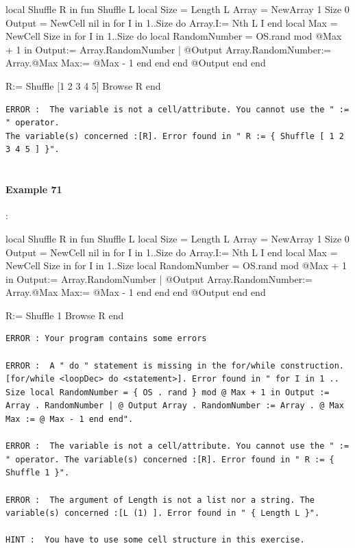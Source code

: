 \documentclass[11pt,a4paper,twoside,openright]{report}
\begin{document}
\begin{OZ}
local Shuffle R in 
    fun {Shuffle L}
		local
            Size = {Length L}
            Array = {NewArray 1 Size 0}
            Output = {NewCell nil}
        in
            for I in 1..Size do
    			Array.I:= {Nth L I}
    		end
            local
                Max = {NewCell Size}
            in
                for I in 1..Size do
                    local RandomNumber = {OS.rand} mod @Max + 1 in
                    Output:= Array.RandomNumber | @Output
                    Array.RandomNumber:= Array.@Max
                    Max:= @Max - 1
                    end
                end
            end
            @Output
		end
	end

R:= {Shuffle [1 2 3 4 5]}
{Browse R}
end
\end{OZ}

\begin{lstlisting}
ERROR :  The variable is not a cell/attribute. You cannot use the " := " operator. 
The variable(s) concerned :[R]. Error found in " R := { Shuffle [ 1 2 3 4 5 ] }".


\end{lstlisting}

\newpage
\paragraph{Example 71}:

\begin{OZ}
local Shuffle R in 
    fun {Shuffle L}
		local
            Size = {Length L}
            Array = {NewArray 1 Size 0}
            Output = {NewCell nil}
        in
            for I in 1..Size do
    			Array.I:= {Nth L I}
    		end
            local
                Max = {NewCell Size}
            in
                for I in 1..Size
                    local RandomNumber = {OS.rand} mod @Max + 1 in
                    Output:= Array.RandomNumber | @Output
                    Array.RandomNumber:= Array.@Max
                    Max:= @Max - 1
                    end
                end
            end
            @Output
		end
	end

R:= {Shuffle 1}
{Browse R}
end
\end{OZ}

\begin{lstlisting}
ERROR : Your program contains some errors

ERROR :  A " do " statement is missing in the for/while construction. [for/while <loopDec> do <statement>]. Error found in " for I in 1 .. Size local RandomNumber = { OS . rand } mod @ Max + 1 in Output := Array . RandomNumber | @ Output Array . RandomNumber := Array . @ Max Max := @ Max - 1 end end".

ERROR :  The variable is not a cell/attribute. You cannot use the " := " operator. The variable(s) concerned :[R]. Error found in " R := { Shuffle 1 }".

ERROR :  The argument of Length is not a list nor a string. The variable(s) concerned :[L (1) ]. Error found in " { Length L }".

HINT :  You have to use some cell structure in this exercise.

\end{lstlisting}
\end{document}
